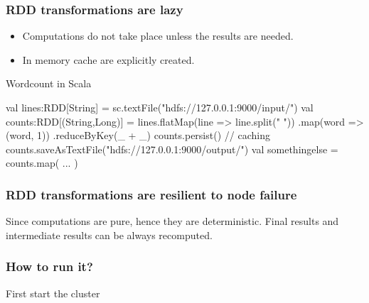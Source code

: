 \documentclass{beamer}
\newcommand{\beb}{\begin{exampleblock}}
\newcommand{\eeb}{\end{exampleblock}}
\begin{document}


\begin{frame}[fragile]
\frametitle{RDD transformations are lazy}

\begin{itemize}
\item Computations do not take place unless the results are needed.
\item In memory cache are explicitly created.
\end{itemize}
\beb{Wordcount in Scala} 
\begin{code}
val lines:RDD[String] = 
    sc.textFile("hdfs://127.0.0.1:9000/input/")
val counts:RDD[(String,Long)] = 
    lines.flatMap(line => line.split(" "))
    .map(word => (word, 1))
    .reduceByKey(_ + _)
counts.persist() // caching
counts.saveAsTextFile("hdfs://127.0.0.1:9000/output/")
val somethingelse = counts.map( ... )
\end{code} \eeb

\end{frame}




\begin{frame}[fragile]
\frametitle{RDD transformations are resilient to node failure}

Since computations are pure, hence they are deterministic. 
Final results and intermediate results can be always recomputed.
\end{frame}








\begin{frame}[fragile]
\frametitle{How to run it?}

First start the cluster
\end{frame}
\end{document}
